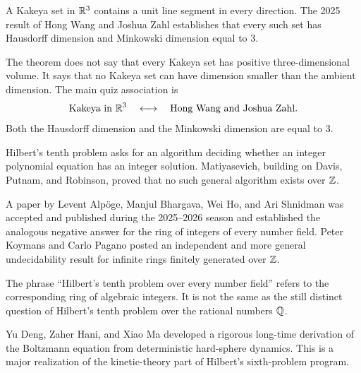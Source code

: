     \begin{theorem}
        A Kakeya set in $\mathbb{R}^3$ contains a unit line segment in every direction.
        The 2025 result of Hong Wang and Joshua Zahl establishes that every such
        set has Hausdorff dimension and Minkowski dimension equal to $3$.
    \end{theorem}

    \begin{idea}
        The theorem does not say that every Kakeya set has positive
        three-dimensional volume. It says that no Kakeya set can have dimension
        smaller than the ambient dimension. The main quiz association is
        \[
            \text{Kakeya in }\mathbb{R}^3
            \quad\longleftrightarrow\quad
            \text{Hong Wang and Joshua Zahl}.
        \]
        Both the Hausdorff dimension and the Minkowski dimension are equal to
        $3$.
    \end{idea}

    \begin{fact}
        Hilbert's tenth problem asks for an algorithm deciding whether an
        integer polynomial equation has an integer solution. Matiyasevich,
        building on Davis, Putnam, and Robinson, proved that no such general
        algorithm exists over $\mathbb{Z}$.

        A paper by Levent Alp\"oge, Manjul Bhargava, Wei Ho, and Ari
        Shnidman was accepted and published during the 2025--2026 season and
        established the analogous negative answer for the ring of integers of
        every number field. Peter Koymans and Carlo Pagano posted an independent
        and more general undecidability result for infinite rings finitely
        generated over $\mathbb{Z}$.
    \end{fact}

    \begin{remark}
        The phrase ``Hilbert's tenth problem over every number field'' refers to
        the corresponding ring of algebraic integers. It is not the same as the
        still distinct question of Hilbert's tenth problem over the rational
        numbers $\mathbb{Q}$.
    \end{remark}

    \begin{fact}
        Yu Deng, Zaher Hani, and Xiao Ma developed a rigorous long-time
        derivation of the Boltzmann equation from deterministic hard-sphere
        dynamics. This is a major realization of the kinetic-theory part of
        Hilbert's sixth-problem program.
    \end{fact}

